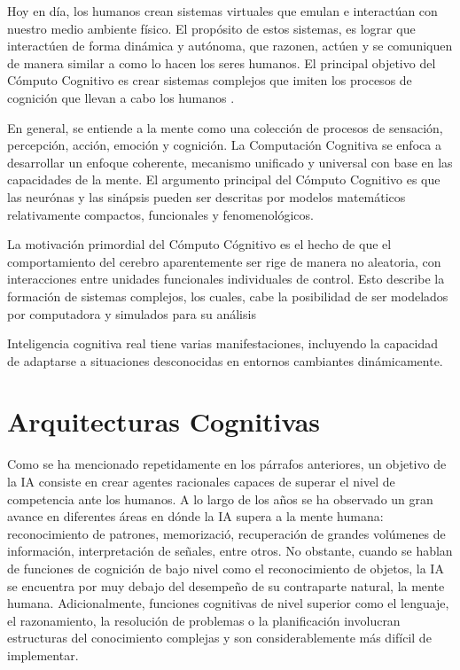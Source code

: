Hoy en día, los humanos crean sistemas virtuales que emulan e interact\'{u}an con nuestro medio ambiente físico. El prop\'{o}sito de estos sistemas, es lograr que interact\'{u}en de forma din\'{a}mica y aut\'{o}noma, que razonen, act\'{u}en y se comuniquen de manera similar a como lo hacen los seres humanos. El principal objetivo del C\'{o}mputo Cognitivo es crear sistemas complejos que imiten los procesos de cognici\'{o}n que llevan a cabo los humanos \cite{crowder2014artificial}.

En general, se entiende a la mente como una colección de procesos de sensaci\'{o}n, percepci\'{o}n, acci\'{o}n, emoci\'{o}n y cognici\'{o}n. La Computaci\'{o}n Cognitiva se enfoca a desarrollar un enfoque coherente, mecanismo unificado y universal con base en las capacidades de la mente. El argumento principal del C\'{o}mputo Cognitivo es que las neur\'{o}nas y las sin\'{a}psis pueden ser descritas por modelos matem\'{a}ticos relativamente compactos, funcionales y fenomenol\'{o}gicos.

La motivación primordial del C\'{o}mputo C\'{ognitivo} es el hecho de que el comportamiento
del cerebro aparentemente ser rige de manera no aleatoria, con interacciones entre unidades funcionales individuales de control. Esto describe la formaci\'{o}n de sistemas complejos, los cuales, cabe la posibilidad de ser modelados por computadora y simulados para su an\'{a}lisis \cite{cc}

Inteligencia cognitiva real tiene varias manifestaciones, incluyendo la capacidad de adaptarse a situaciones desconocidas en entornos cambiantes din\'{a}micamente.
\section{Arquitecturas Cognitivas}

Como se ha mencionado repetidamente en los p\'{a}rrafos anteriores, un objetivo de la IA consiste en crear agentes racionales capaces de superar el nivel de competencia ante los humanos. A lo largo de los a\~nos se ha observado un gran avance en diferentes \'{a}reas en d\'{o}nde la IA supera a la mente humana: reconocimiento de patrones, memorizaci\'{o}, recuperaci\'{o}n de grandes vol\'{u}menes de informaci\'{o}n, interpretaci\'{o}n de se\~nales, entre otros. No obstante, cuando se hablan de funciones de cognici\'{o}n de bajo nivel como el reconocimiento de objetos, la IA se encuentra por muy debajo del desempe\~no de su contraparte natural, la mente humana. Adicionalmente, funciones cognitivas de nivel superior como el lenguaje, el razonamiento, la resoluci\'{o}n de problemas o la planificaci\'{o}n involucran estructuras del conocimiento complejas y son considerablemente m\'{a}s dif\'{i}cil de implementar. 

